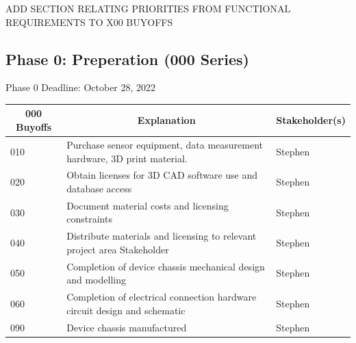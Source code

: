 \documentclass[12pt]{article}
\begin{document}
ADD SECTION RELATING PRIORITIES FROM FUNCTIONAL REQUIREMENTS TO X00 BUYOFFS

\noindent
\subsection{Phase 0: Preperation (000 Series)}
Phase 0 Deadline: October 28, 2022\\

\begin{table}[H]
  \centering
  \begin{tabular}{|p{2cm}|p{10cm}|p{2cm}|}
  \hline
  \multicolumn{1}{|c|}{\textbf{000 Buyoffs}} & \multicolumn{1}{c|}{\textbf{Explanation}} & \multicolumn{1}{|c|}{\textbf{Stakeholder(s)}}
  \\ \hline
  010
  & Purchase sensor equipment, data measurement hardware, 3D print material.
  & Stephen
  \newline                                
  \\ \hline

  020                              
  & Obtain licenses for 3D CAD software use and database access
  & Stephen
  \newline                                
  \\ \hline

  030                          
  & Document material costs and licensing constraints
  & Stephen
  \newline                                
  \\ \hline

  040                                
  & Distribute materials and licensing to relevant project area Stakeholder
  & Stephen 
  \newline                            
  \\ \hline

  050                                
  & Completion of device chassis mechanical design and modelling
  & Stephen 
  \newline                            
  \\ \hline

  060                                
  & Completion of electrical connection hardware circuit design and schematic
  & Stephen 
  \newline                            
  \\ \hline

  090                                
  & Device chassis manufactured
  & Stephen 
  \newline                            
  \\ \hline

  \end{tabular}
\end{table}
\newpage
\end{document}
